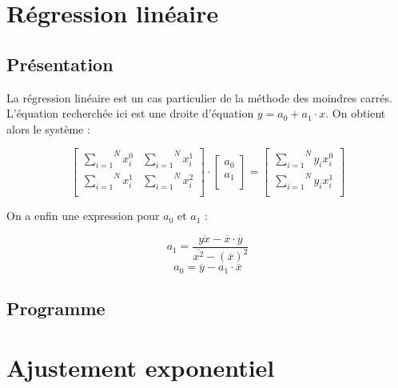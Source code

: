 \documentclass{report}
\begin{document}
    \section{Régression linéaire}
      \subsection{Présentation}
	La régression linéaire est un cas particulier de la méthode des moindres carrés. L'équation recherchée ici est une droite d'équation $y=a_{0} + a_{1} \cdot x$. On obtient alors le système :
	
	\begin{equation*}
	  \begin{bmatrix}
	    \overset{N}{\underset{i=1}{\sum}} x_{i}^{0} & \overset{N}{\underset{i=1}{\sum}} x_{i}^{1} \\
	    \overset{N}{\underset{i=1}{\sum}} x_{i}^{1} & \overset{N}{\underset{i=1}{\sum}} x_{i}^{2} \\
	  \end{bmatrix}
	  \cdot
	  \begin{bmatrix}
	    a_{0} \\
	    a_{1} \\
	  \end{bmatrix}
	  =
	  \begin{bmatrix}
	    \overset{N}{\underset{i=1}{\sum}} y_{i} x_{i}^{0} \\
	    \overset{N}{\underset{i=1}{\sum}} y_{i} x_{i}^{1} \\
	  \end{bmatrix}
	\end{equation*}
	
	On a enfin une expression pour $a_{0}$ et $a_{1}$ :
	
	\begin{displaymath}
	  a_{1} = \frac{\overline{yx}-\overline{x}\cdot\overline{y}}{\overline{x^{2}}-(\overline{x})^2}
	\end{displaymath}
	\vspace{0.1 cm}
	\begin{displaymath}
	  a_{0} = \overline{y} - a_{1} \cdot \overline{x}
	\end{displaymath}
      \subsection{Programme}
	
    \newpage
    \section{Ajustement exponentiel}
\end{document}
